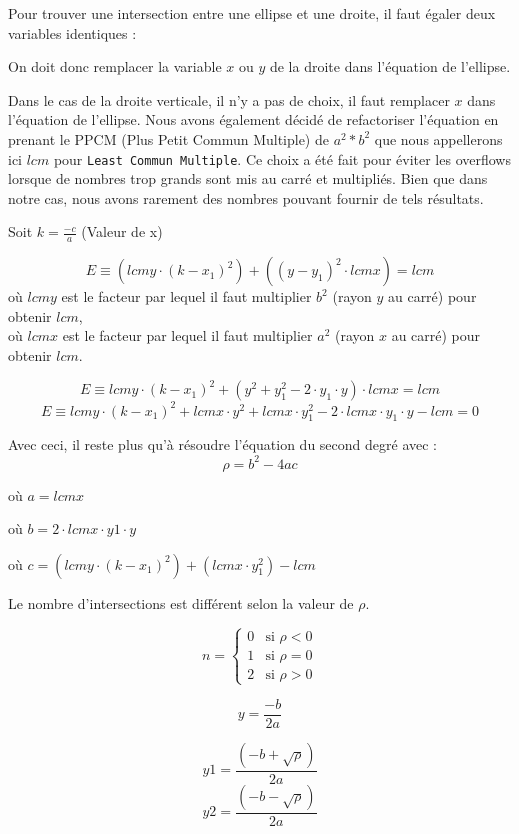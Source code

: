 \documentclass[]{report}
\begin{document}
Pour trouver une intersection entre une ellipse
et une droite, il faut égaler deux variables 
identiques :

On doit donc remplacer la variable $x$ ou $y$ de la droite dans
l'équation de l'ellipse.

Dans le cas de la droite verticale, il n'y a pas de choix, il faut remplacer
$x$ dans l'équation de l'ellipse.
Nous avons également décidé de refactoriser l'équation en 
prenant le PPCM (Plus Petit Commun Multiple) de $a^2 * b^2$ que
nous appellerons ici $lcm$ pour \texttt{Least Commun Multiple}. 
Ce choix a été fait pour éviter les overflows lorsque 
de nombres trop grands sont mis au carré et multipliés.
Bien que dans notre cas, nous avons rarement des nombres
pouvant fournir de tels résultats.

Soit $k = \frac{-c}{a} $ (Valeur de x)

$$ E \equiv (lcmy \cdot (k - x_1)^2) + ((y - y_1)^2 \cdot lcmx) = lcm $$  
où $lcmy$ est le facteur par lequel il faut multiplier
$b^2$ (rayon $y$ au carré) pour obtenir $lcm$, \\
où $lcmx$ est le facteur par lequel il faut multiplier
$a^2$ (rayon $x$ au carré) pour obtenir $lcm$.

$$ E \equiv lcmy \cdot (k - x_1)^2 + (y^2 + y_1^2 - 2 \cdot y_1 \cdot y)
\cdot lcmx = lcm$$
$$ E \equiv lcmy \cdot (k - x_1)^2 + lcmx \cdot y^2 + lcmx \cdot
y_1^2 - 2 \cdot lcmx \cdot y_1 \cdot y - lcm = 0 $$

Avec ceci, il reste plus qu'à résoudre l'équation du second degré 
avec : $$ \rho = b^2 - 4ac$$

\begin{description}
\item où $ a = lcmx $ 
\item où $ b = 2 \cdot lcmx \cdot y1 \cdot y $
\item où $ c = (lcmy \cdot (k-x_1)^2) + (lcmx \cdot y_1^2) - lcm $
\end{description}

Le nombre d'intersections est différent selon la valeur de $\rho$.

\[
	n =
	\begin{cases}
		0 & \text{si } \rho < 0 \\
		1 & \text{si } \rho = 0 \\
		2 & \text{si } \rho > 0  
	\end{cases}
\]

$$ y = \frac {-b}{2a} $$

$$ y1 = \frac{(-b + \sqrt{\rho})}{2a} $$
$$ y2 = \frac{(-b - \sqrt{\rho})}{2a} $$
\end{document}
